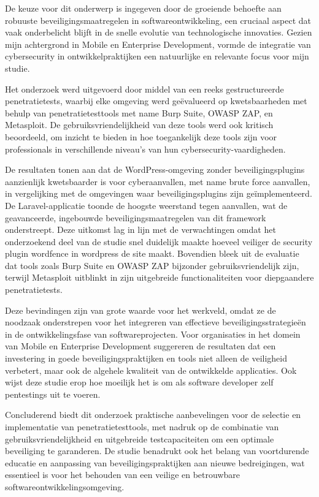 De keuze voor dit onderwerp is ingegeven door de groeiende behoefte aan robuuste beveiligingsmaatregelen in softwareontwikkeling, een cruciaal 
aspect dat vaak onderbelicht blijft in de snelle evolutie van technologische innovaties. Gezien mijn achtergrond in Mobile en Enterprise 
Development, vormde de integratie van cybersecurity in ontwikkelpraktijken een natuurlijke en relevante focus voor mijn studie.

Het onderzoek werd uitgevoerd door middel van een reeks gestructureerde penetratietests, waarbij elke omgeving werd geëvalueerd op 
kwetsbaarheden met behulp van penetratietesttools met name Burp Suite, OWASP ZAP, en Metasploit. De gebruiksvriendelijkheid 
van deze tools werd ook kritisch beoordeeld, om inzicht te bieden in hoe toegankelijk deze tools zijn voor professionals in verschillende 
niveau's van hun cybersecurity-vaardigheden.

De resultaten tonen aan dat de WordPress-omgeving zonder beveiligingsplugins aanzienlijk kwetsbaarder is voor cyberaanvallen, met name 
brute force aanvallen, in vergelijking met de omgevingen waar beveiligingsplugins zijn geïmplementeerd. De Laravel-applicatie toonde 
de hoogste weerstand tegen aanvallen, wat de geavanceerde, ingebouwde beveiligingsmaatregelen van dit framework onderstreept.
Deze uitkomst lag in lijn met de verwachtingen omdat het onderzoekend deel van de studie snel duidelijk maakte hoeveel veiliger 
de security plugin wordfence in wordpress de site maakt.
Bovendien bleek uit de evaluatie dat tools zoals Burp Suite en OWASP ZAP bijzonder gebruiksvriendelijk zijn, terwijl Metasploit 
uitblinkt in zijn uitgebreide functionaliteiten voor diepgaandere penetratietests.

Deze bevindingen zijn van grote waarde voor het werkveld, omdat ze de noodzaak onderstrepen voor het integreren van effectieve 
beveiligingsstrategieën in de ontwikkelingsfase van softwareprojecten. Voor organisaties in het domein van Mobile en Enterprise 
Development suggereren de resultaten dat een investering in goede beveiligingspraktijken en tools niet alleen de veiligheid 
verbetert, maar ook de algehele kwaliteit van de ontwikkelde applicaties. Ook wijst deze studie erop hoe moeilijk het 
is om als software developer zelf pentestings uit te voeren.

Concluderend biedt dit onderzoek praktische aanbevelingen voor de selectie en implementatie van penetratietesttools, met 
nadruk op de combinatie van gebruiksvriendelijkheid en uitgebreide testcapaciteiten om een optimale beveiliging te 
garanderen. De studie benadrukt ook het belang van voortdurende educatie en aanpassing van beveiligingspraktijken aan nieuwe 
bedreigingen, wat essentieel is voor het behouden van een veilige en betrouwbare softwareontwikkelingsomgeving.
